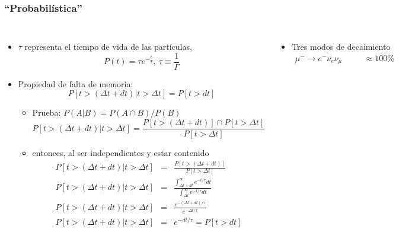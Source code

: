 \documentclass[xetex,mathserif,serif,10pt]{beamer}
\begin{document}
\begin{frame}
  \frametitle{``Probabilística''}
  \begin{columns}
    \begin{itemize}
      \item $\tau$ representa el tiempo de vida de las partículas,
        \vspace{-0.5em}
        \[P(t) = \tau e^{-{\frac t\tau}},\ \tau\equiv\frac1\Gamma \] 
        \vspace{-1.0em}
      \item Propiedad de falta de memoria: 
        \vspace{-0.5em}
        \[{ P[t>(\Delta t + dt) | t>\Delta t] = P[t>dt] }\]
        \vspace{-1.0em}
        \begin{itemize}
          \item Prueba: $P(A|B)=P(A\cap B)/P(B)$
          \vspace{-0.5em}
          {\tiny{
              \[ P[t>(\Delta t + dt) | t>\Delta t] = \frac{P[t>(\Delta t + dt)] \cap P[t>\Delta t] }{P[t>\Delta t]} \] 
          }}
          \vspace{-1.0em}
          \item entonces, al ser independientes y estar contenido
          \vspace{-0.5em}
          {\tiny{
          \begin{eqnarray*}
            P[t>(\Delta t + dt) | t>\Delta t] &=& \frac{P[t>(\Delta t + dt)]}{P[t>\Delta t]}\\
            P[t>(\Delta t + dt) | t>\Delta t] &=& \frac{\int_{\Delta t + dt}^\infty e^{-t/\tau} dt}{\int_{\Delta t}^\infty e^{-t/\tau} dt} \\
            P[t>(\Delta t + dt) | t>\Delta t] &=& \frac{e^{-(\Delta t + dt)/\tau}}{e^{-{\Delta t}/\tau}} \\
            P[t>(\Delta t + dt) | t>\Delta t] &=& e^{-dt/\tau} = P[t>dt]
          \end{eqnarray*}
          }}
          \vspace{-1.0em}
      \end{itemize}
    \end{itemize}
    \begin{itemize}
      \item Tres modos de decaimiento
      \begin{eqnarray*}
        \mu^- \to e^- \bar{\nu_e} \nu_\mu         &\quad& \approx 100\%\\

\end{eqnarray*}
\end{itemize}
\end{columns}
\end{frame}
\end{document}

